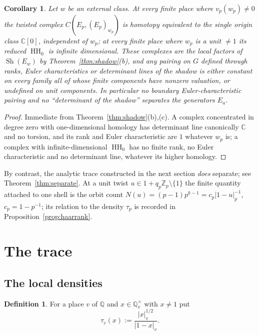 \documentclass[11pt]{amsart}
\newtheorem{corollary}[theorem]{Corollary}
\theoremstyle{definition}
\newtheorem{definition}[theorem]{Definition}
\theoremstyle{remark}
\newcommand{\C}{\mathbb C}
\newcommand{\Z}{\mathbb Z}
\newcommand{\Q}{\mathbb Q}
\newcommand{\HH}{\operatorname{HH}}
\newcommand{\Sh}{\operatorname{Sh}}
\begin{document}
\begin{corollary}\label{cor:blind}
Let $w$ be an external class.  At every finite place where $v_p(w_p)\ne0$ the
twisted complex $C(E_p,(E_p)_{w_p})$ is homotopy equivalent to the single
origin class $\C[0]$, independent of $w_p$; at every finite place where $w_p$
is a unit $\ne1$ its reduced $\HH_0$ is infinite dimensional.  These complexes are the local factors of
$\Sh(E_w)$ by Theorem~\ref{thm:shadow}(b), and any pairing on $G$ defined through ranks, Euler characteristics
or determinant lines of the shadow is either \emph{constant} on every family
all of whose finite components have nonzero valuation, or \emph{undefined} on
unit components.  In particular no boundary Euler-characteristic pairing and
no ``determinant of the shadow'' separates the generators $E_a$.
\end{corollary}

\begin{proof}
Immediate from Theorem~\ref{thm:shadow}(b),(c).  A complex concentrated in degree
zero with one-dimensional homology has determinant line canonically $\C$ and
no torsion, and its rank and Euler characteristic are $1$ whatever $w_p$ is; a
complex with infinite-dimensional $\HH_0$ has no finite rank, no Euler
characteristic and no determinant line, whatever its higher homology.
\end{proof}

By contrast, the analytic trace constructed in the next section \emph{does}
separate; see Theorem~\ref{thm:separate}.  At a unit twist
$u\in1+q_p\Z_p\setminus\{1\}$ the finite quantity attached to one shell is the
orbit count $N(u)=(p-1)p^{k-1}=c_p|1-u|_p^{-1}$, $c_p=1-p^{-1}$; its relation to
the density $\tau_p$ is recorded in Proposition~\ref{prop:haarrank}.

\section{The trace}\label{sec:trace}

\subsection{The local densities}

\begin{definition}\label{def:tau}
For a place $v$ of $\Q$ and $x\in\Q_v^{\times}$ with $x\ne1$ put
\begin{equation}\label{eq:tau}
\tau_v(x):=\frac{|x|_v^{1/2}}{|1-x|_v}.
\end{equation}
\end{definition}
\end{document}
